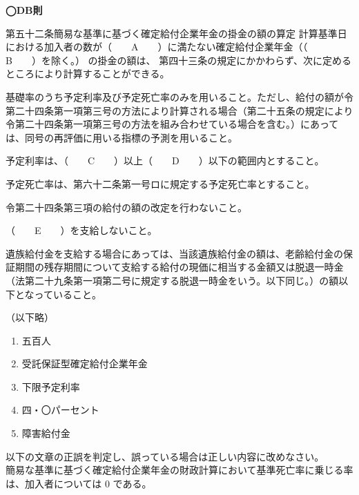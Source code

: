 \begin{fillblank}[数理人試験 H25 問題1(3)e~i 改題]
  \noindent \textbf{◯DB則}
  \begin{lawstructure}
    \begin{lawarticle}{第五十二条}{簡易な基準に基づく確定給付企業年金の掛金の額の算定}
      計算基準日における加入者の数が（　　A　　）に満たない確定給付企業年金（（　　B　　）を除く。）
      の掛金の額は、
      第四十三条の規定にかかわらず、次に定めるところにより計算することができる。

      基礎率のうち予定利率及び予定死亡率のみを用いること。ただし、給付の額が令第二十四条第一項第三号の方法により計算される場合（第二十五条の規定により令第二十四条第一項第三号の方法を組み合わせている場合を含む。）にあっては、同号の再評価に用いる指標の予測を用いること。

      予定利率は、（　　C　　）以上（　　D　　）以下の範囲内とすること。

      予定死亡率は、第六十二条第一号ロに規定する予定死亡率とすること。

      令第二十四条第三項の給付の額の改定を行わないこと。

      （　　E　　）を支給しないこと。

      遺族給付金を支給する場合にあっては、当該遺族給付金の額は、老齢給付金の保証期間の残存期間について支給する給付の現価に相当する金額又は脱退一時金（法第二十九条第一項第二号に規定する脱退一時金をいう。以下同じ。）の額以下となっていること。

      （以下略）
    \end{lawarticle}
  \end{lawstructure}
\end{fillblank}

\begin{answerbox}
  \begin{enumerate}[A: ]
    \item 五百人
    \item 受託保証型確定給付企業年金
    \item 下限予定利率
    \item 四・〇パーセント
    \item 障害給付金
  \end{enumerate}
\end{answerbox}

\begin{truefalse}[年金2 2025 問題1(1)ウ\ajRoman{4}]
  以下の文章の正誤を判定し、誤っている場合は正しい内容に改めなさい。
\\

  簡易な基準に基づく確定給付企業年金の財政計算において基準死亡率に乗じる率 は、加入者については 0 である。
\end{truefalse}

